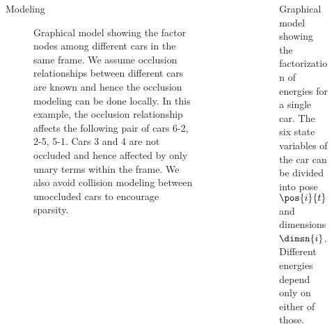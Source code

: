 \documentclass[handout,final]{beamer}
\newlength{\sepwid}
\newlength{\onecolwid}
\begin{document}
\begin{frame}[t]
\begin{columns}[t]
\begin{column}{\onecolwid}
\begin{block}{Modeling}
        \begin{figure}
          \centering
          \caption{Graphical model showing the factor nodes among different
            cars in the same frame. We assume occlusion relationships between
            different cars are known and hence the occlusion modeling can be done
            locally. In this example, the occlusion relationship affects the
            following pair of cars 6-2, 2-5, 5-1. Cars 3 and 4 are not occluded
            and hence affected by only unary terms within the frame. We also avoid 
            collision modeling between unoccluded cars to encourage sparsity.
          }
          \label{fig:graphmodel}
        \end{figure}

      \end{block}
    \end{column}

  \begin{column}{\sepwid}\end{column}			%

      
    \begin{column}{\onecolwid}
        \begin{figure}
          \centering
          
          \caption{Graphical model showing the factorization of energies for a
            single car. The six state variables of the car can be divided into
            pose $\pos{i}{t}$ and dimensions $\dimsn{i}$. Different energies
          depend only on either of those.}
        \end{figure}


\end{column}
\end{columns}
\end{frame}
\end{document}
